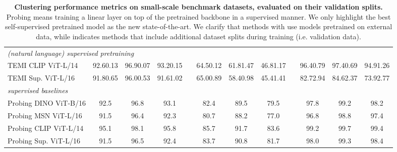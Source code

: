 \documentclass{bmvc2k}
\begin{document}
\begin{table*}
\begin{center}
\begin{adjustbox}{width=1\columnwidth}
\begin{tabular}{ l c c c c c c c c c c c }
\hline 
   \multicolumn{12}{l}{\textit{(natural language) supervised pretraining}}\\

TEMI CLIP ViT-L/14 &  92.60.13 &  96.90.07 &  93.20.15 &      &  64.50.12 &  61.81.47 &  46.81.17 &      & 96.40.79 &  97.40.69 &  94.91.26 \\

TEMI Sup. ViT-L/16 & 91.80.65 &  96.00.53 &  91.61.02 &      & 65.00.89 &  58.40.98 &  45.41.41 &      & 82.72.94 &  84.62.37 &  73.92.77 \\
		\hline \hline
   \multicolumn{12}{l}{\textit{supervised baselines}}\\
  
  \multicolumn{1}{l}{Probing DINO ViT-B/16 }   & 92.5 & 96.8 & 93.1 &     & 82.4 & 89.5 & 79.5 &      & 97.8 & 99.2 & 98.2 \\ 

       \multicolumn{1}{l}{Probing MSN ViT-L/16} & 91.5 & 96.4 & 92.3 &   & 80.7    & 88.2 & 77.0 & & 96.8 &   98.8   & 97.4 \\

     \multicolumn{1}{l}{Probing CLIP ViT-L/14}   & 95.1 & 98.1 & 95.8 &     & 85.7 & 91.7 & 83.6 &      & 99.2 & 99.7 & 99.4 \\ 
     
  \multicolumn{1}{l}{Probing Sup. ViT-L/16}   & 91.5 & 96.5 & 92.4 &     & 83.7 & 
90.8 & 81.7 &      & 98.0 & 99.3 & 98.4 \\ 
			\bottomrule
		\end{tabular}\end{adjustbox}	
  \end{center}
	\caption{\textbf{Clustering performance metrics on small-scale benchmark datasets, evaluated on their validation splits.} Probing means training a linear layer on top of the pretrained backbone in a supervised manner. We only highlight the best self-supervised pretrained model as the new state-of-the-art. We clarify that methods with  use models pretrained on external data, while  indicates methods that include additional dataset splits during training (i.e. validation data).}
    \label{tabel:small-datasets-sota}
\end{table*}
\end{document}
